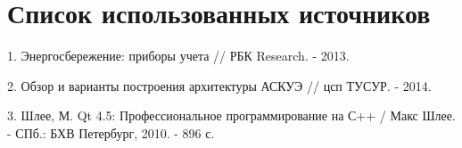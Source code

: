 


 
 
 
 \newpage
 \tableofcontents
 
 
 
 
 
 \newpage
 
 
 
 \newpage
 \section*{Список использованных источников}
 1. Энергосбережение: приборы учета // РБК Research. - 2013.
 
 2. Обзор и варианты построения архитектуры АСКУЭ // цсп ТУСУР. - 2014.
 
 3. Шлее, М. Qt 4.5: Профессиональное программирование на С++ / Макс Шлее. - СПб.: БХВ Петербург, 2010. - 896 с.


